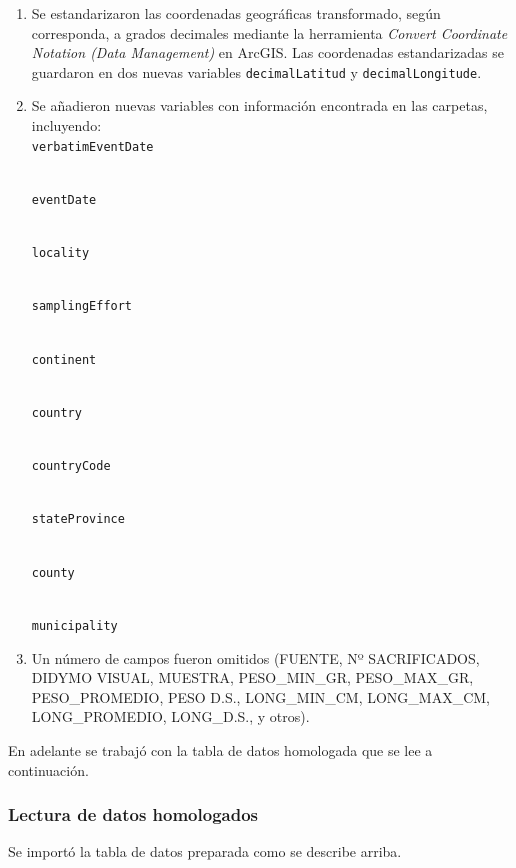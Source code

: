 \documentclass[sn-apa,pdflatex]{sn-jnl}
\begin{document}
\begin{enumerate}
\def\labelenumi{\arabic{enumi}.}
\setcounter{enumi}{2}
\item
  Se estandarizaron las coordenadas geográficas transformado, según
  corresponda, a grados decimales mediante la herramienta \emph{Convert
  Coordinate Notation (Data Management)} en ArcGIS. Las coordenadas
  estandarizadas se guardaron en dos nuevas variables
  \texttt{decimalLatitud} y \texttt{decimalLongitude}.
\item
  Se añadieron nuevas variables con información encontrada en las
  carpetas, incluyendo:\\
  \texttt{verbatimEventDate}\strut \\
  \texttt{eventDate}\strut \\
  \texttt{locality}\strut \\
  \texttt{samplingEffort}\strut \\
  \texttt{continent}\strut \\
  \texttt{country}\strut \\
  \texttt{countryCode}\strut \\
  \texttt{stateProvince}\strut \\
  \texttt{county}\strut \\
  \texttt{municipality}
\item
  Un número de campos fueron omitidos (FUENTE, Nº SACRIFICADOS, DIDYMO
  VISUAL, MUESTRA, PESO\_MIN\_GR, PESO\_MAX\_GR, PESO\_PROMEDIO, PESO
  D.S., LONG\_MIN\_CM, LONG\_MAX\_CM, LONG\_PROMEDIO, LONG\_D.S., y
  otros).
\end{enumerate}

En adelante se trabajó con la tabla de datos homologada que se lee a
continuación.

\subsubsection{Lectura de datos
homologados}\label{lectura-de-datos-homologados}

Se importó la tabla de datos preparada como se describe arriba.
\end{document}
